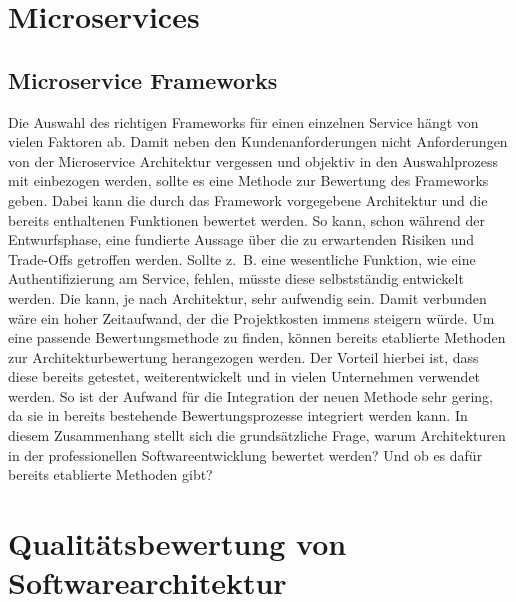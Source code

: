 \section{Microservices}


\subsection{Microservice Frameworks}


Die Auswahl des richtigen Frameworks für einen einzelnen Service hängt von vielen Faktoren ab.
Damit neben den Kundenanforderungen nicht Anforderungen von der
Microservice Architektur vergessen und objektiv in den Auswahlprozess
mit einbezogen werden, sollte es eine Methode zur Bewertung des Frameworks
geben. Dabei kann die durch das Framework vorgegebene Architektur und die
bereits enthaltenen Funktionen bewertet werden. So kann, schon während der
Entwurfsphase, eine fundierte Aussage über die zu erwartenden Risiken und Trade-Offs
getroffen werden. Sollte z.~B. eine wesentliche Funktion, wie eine Authentifizierung am
Service, fehlen, müsste diese selbstständig entwickelt werden.
Die kann, je nach Architektur, sehr aufwendig sein. Damit verbunden wäre ein hoher Zeitaufwand, 
der die Projektkosten immens steigern würde.
Um eine passende Bewertungsmethode zu finden, können bereits etablierte Methoden zur
Architekturbewertung herangezogen werden. Der Vorteil hierbei ist, dass diese bereits
getestet, weiterentwickelt und in vielen Unternehmen verwendet werden.
So ist der Aufwand für die Integration der neuen Methode sehr gering, da sie in bereits bestehende
Bewertungsprozesse integriert werden kann.
In diesem Zusammenhang stellt sich die grundsätzliche Frage, warum Architekturen in der professionellen Softwareentwicklung bewertet werden? Und ob es dafür bereits etablierte Methoden gibt?  

\section{Qualitätsbewertung von Softwarearchitektur}


